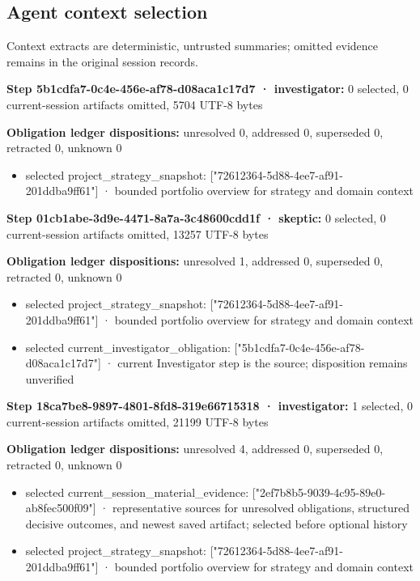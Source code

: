 \documentclass[11pt]{article}
\begin{document}
\subsection{Agent context selection}
Context extracts are deterministic, untrusted summaries; omitted evidence remains in the original session records.\par
\textbf{Step 5b1cdfa7-0c4e-456e-af78-d08aca1c17d7 · investigator:} 0 selected, 0 current-session artifacts omitted, 5704 UTF-8 bytes\par
\textbf{Obligation ledger dispositions:} unresolved 0, addressed 0, superseded 0, retracted 0, unknown 0\par
\begin{itemize}
\item selected project\_strategy\_snapshot: ["72612364-5d88-4ee7-af91-201ddba9ff61"] · bounded portfolio overview for strategy and domain context
\end{itemize}
\textbf{Step 01cb1abe-3d9e-4471-8a7a-3c48600cdd1f · skeptic:} 0 selected, 0 current-session artifacts omitted, 13257 UTF-8 bytes\par
\textbf{Obligation ledger dispositions:} unresolved 1, addressed 0, superseded 0, retracted 0, unknown 0\par
\begin{itemize}
\item selected project\_strategy\_snapshot: ["72612364-5d88-4ee7-af91-201ddba9ff61"] · bounded portfolio overview for strategy and domain context
\item selected current\_investigator\_obligation: ["5b1cdfa7-0c4e-456e-af78-d08aca1c17d7"] · current Investigator step is the source; disposition remains unverified
\end{itemize}
\textbf{Step 18ca7be8-9897-4801-8fd8-319e66715318 · investigator:} 1 selected, 0 current-session artifacts omitted, 21199 UTF-8 bytes\par
\textbf{Obligation ledger dispositions:} unresolved 4, addressed 0, superseded 0, retracted 0, unknown 0\par
\begin{itemize}
\item selected current\_session\_material\_evidence: ["2ef7b8b5-9039-4c95-89e0-ab8fec500f09"] · representative sources for unresolved obligations, structured decisive outcomes, and newest saved artifact; selected before optional history
\item selected project\_strategy\_snapshot: ["72612364-5d88-4ee7-af91-201ddba9ff61"] · bounded portfolio overview for strategy and domain context
\end{itemize}
\end{document}
